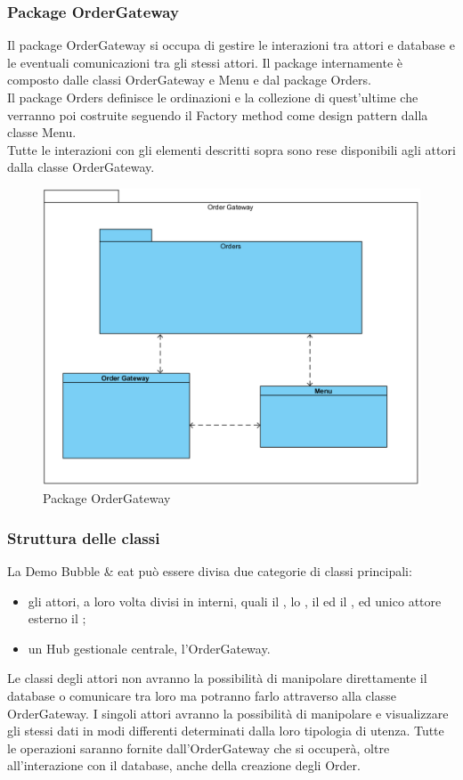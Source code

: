 \subsubsection{Package Order\-Gateway}
Il package Order\-Gateway si occupa di gestire le interazioni tra attori e database e le eventuali comunicazioni tra gli stessi attori. Il package internamente è composto dalle classi Order\-Gateway e Menu e dal package Orders.\\
Il package Orders definisce le ordinazioni e la collezione di quest'ultime che verranno poi costruite seguendo il Factory method come design pattern dalla classe Menu.\\
Tutte le interazioni con gli elementi descritti sopra sono rese disponibili agli attori dalla classe Order\-Gateway.
\begin{figure}[H]
	\centering
	\includegraphics[width=14cm]{diagrammi_img/classi_e_package/ordergate.png}
	\caption{Package Order\-Gateway}
\end{figure}

	\subsubsection{Struttura delle classi}
	La Demo Bubble \& eat può essere divisa due categorie di classi principali:
	\begin{itemize}
		\item gli attori, a loro volta divisi in interni, quali il \Manager{}, lo \Chef{}, il \Deliveryman{} ed il \Purchasingmanager{}, ed unico attore esterno il \Customer{};
		\item un Hub gestionale centrale, l’Order\-Gateway.
	\end{itemize}
	Le classi degli attori non avranno la possibilità di manipolare direttamente il database o comunicare tra loro ma potranno farlo attraverso alla classe Order\-Gateway.
	I singoli attori avranno la possibilità di manipolare e visualizzare gli stessi dati in modi differenti determinati dalla loro tipologia di utenza.
	Tutte le operazioni saranno fornite dall'Order\-Gateway che si occuperà, oltre all'interazione con il database, anche della creazione degli Order.
	
